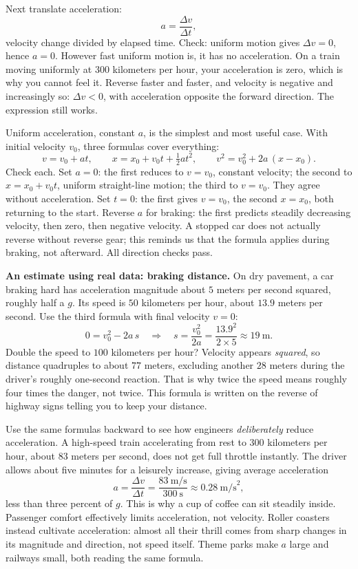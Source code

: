 \begin{mainline}
Next translate acceleration:
\[
  a=\frac{\Delta v}{\Delta t},
\]
velocity change divided by elapsed time. Check: uniform motion gives \(\Delta v=0\), hence \(a=0\). However fast uniform motion is, it has no acceleration. On a train moving uniformly at 300 kilometers per hour, your acceleration is zero, which is why you cannot feel it. Reverse faster and faster, and velocity is negative and increasingly so: \(\Delta v<0\), with acceleration opposite the forward direction. The expression still works.

Uniform acceleration, constant \(a\), is the simplest and most useful case. With initial velocity \(v_0\), three formulas cover everything:
\[
  v=v_0+at,\qquad
  x=x_0+v_0 t+\tfrac12 a t^2,\qquad
  v^2=v_0^2+2a\,(x-x_0).
\]
Check each. Set \(a=0\): the first reduces to \(v=v_0\), constant velocity; the second to \(x=x_0+v_0 t\), uniform straight-line motion; the third to \(v=v_0\). They agree without acceleration. Set \(t=0\): the first gives \(v=v_0\), the second \(x=x_0\), both returning to the start. Reverse \(a\) for braking: the first predicts steadily decreasing velocity, then zero, then negative velocity. A stopped car does not actually reverse without reverse gear; this reminds us that the formula applies during braking, not afterward. All direction checks pass.

\textbf{An estimate using real data: braking distance.} On dry pavement, a car braking hard has acceleration magnitude about \(5\) meters per second squared, roughly half a \(g\). Its speed is \(50\) kilometers per hour, about \(13.9\) meters per second. Use the third formula with final velocity \(v=0\):
\[
  0=v_0^2-2a\,s\quad\Rightarrow\quad s=\frac{v_0^2}{2a}=\frac{13.9^2}{2\times5}\approx 19\ \text{m}.
\]
Double the speed to \(100\) kilometers per hour? Velocity appears \emph{squared}, so distance quadruples to about \(77\) meters, excluding another \(28\) meters during the driver's roughly one-second reaction. That is why twice the speed means roughly four times the danger, not twice. This formula is written on the reverse of highway signs telling you to keep your distance.

Use the same formulas backward to see how engineers \emph{deliberately} reduce acceleration. A high-speed train accelerating from rest to 300 kilometers per hour, about 83 meters per second, does not get full throttle instantly. The driver allows about five minutes for a leisurely increase, giving average acceleration
\[
  a=\frac{\Delta v}{\Delta t}=\frac{83\ \text{m/s}}{300\ \text{s}}\approx 0.28\ \text{m/s}^2,
\]
less than three percent of \(g\). This is why a cup of coffee can sit steadily inside. Passenger comfort effectively limits acceleration, not velocity. Roller coasters instead cultivate acceleration: almost all their thrill comes from sharp changes in its magnitude and direction, not speed itself. Theme parks make \(a\) large and railways small, both reading the same formula.


\end{mainline}
